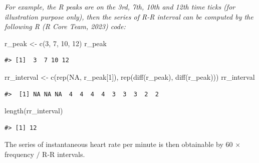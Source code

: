 \documentclass[
]{article}
\newenvironment{Shaded}{\begin{snugshade}}{\end{snugshade}}
\newcommand{\ConstantTok}[1]{\textcolor[rgb]{0.00,0.00,0.00}{#1}}
\newcommand{\DecValTok}[1]{\textcolor[rgb]{0.00,0.00,0.81}{#1}}
\newcommand{\FunctionTok}[1]{\textcolor[rgb]{0.00,0.00,0.00}{#1}}
\newcommand{\NormalTok}[1]{#1}
\newcommand{\OtherTok}[1]{\textcolor[rgb]{0.56,0.35,0.01}{#1}}
\begin{document}
\emph{For example, the R peaks are on the 3rd, 7th, 10th and 12th time
ticks (for illustration purpose only), then the series of R-R interval
can be computed by the following R (R Core Team, 2023) code:}

\begin{Shaded}
\begin{Highlighting}[]
\NormalTok{r\_peak }\OtherTok{\textless{}{-}} \FunctionTok{c}\NormalTok{(}\DecValTok{3}\NormalTok{, }\DecValTok{7}\NormalTok{, }\DecValTok{10}\NormalTok{, }\DecValTok{12}\NormalTok{)}
\NormalTok{r\_peak}
\end{Highlighting}
\end{Shaded}

\begin{verbatim}
#> [1]  3  7 10 12
\end{verbatim}

\begin{Shaded}
\begin{Highlighting}[]
\NormalTok{rr\_interval }\OtherTok{\textless{}{-}} \FunctionTok{c}\NormalTok{(}\FunctionTok{rep}\NormalTok{(}\ConstantTok{NA}\NormalTok{, r\_peak[}\DecValTok{1}\NormalTok{]), }\FunctionTok{rep}\NormalTok{(}\FunctionTok{diff}\NormalTok{(r\_peak), }\FunctionTok{diff}\NormalTok{(r\_peak)))}
\NormalTok{rr\_interval}
\end{Highlighting}
\end{Shaded}

\begin{verbatim}
#>  [1] NA NA NA  4  4  4  4  3  3  3  2  2
\end{verbatim}

\begin{Shaded}
\begin{Highlighting}[]
\FunctionTok{length}\NormalTok{(rr\_interval)}
\end{Highlighting}
\end{Shaded}

\begin{verbatim}
#> [1] 12
\end{verbatim}

The series of instantaneous heart rate per minute is then obtainable by
60 \(\times\) frequency \(/\) R-R intervals.
\end{document}
